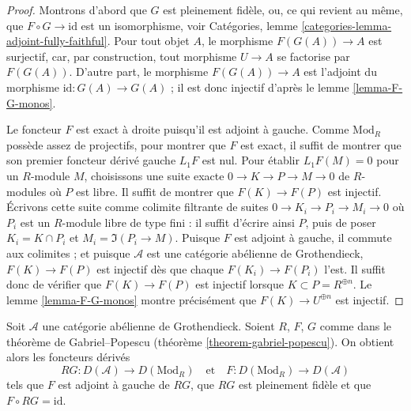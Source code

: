 \begin{proof}
Montrons d'abord que $G$ est pleinement fidèle, ou, ce qui revient au même,
que $F \circ G \to \text{id}$ est un isomorphisme, voir Catégories, lemme
\ref{categories-lemma-adjoint-fully-faithful}. Pour tout objet $A$, le
morphisme $F(G(A)) \to A$ est surjectif, car, par construction, tout morphisme
$U \to A$ se factorise par $F(G(A))$. D'autre part, le morphisme
$F(G(A)) \to A$ est l'adjoint du morphisme
$\text{id} : G(A) \to G(A)$ ; il est donc injectif d'après le lemme
\ref{lemma-F-G-monos}.

\medskip\noindent
Le foncteur $F$ est exact à droite puisqu'il est adjoint à gauche.
Comme $\text{Mod}_R$ possède assez de projectifs, pour montrer que $F$ est
exact, il suffit de montrer que son premier foncteur dérivé gauche $L_1F$ est
nul. Pour établir $L_1F(M) = 0$ pour un $R$-module $M$, choisissons une suite
exacte $0 \to K \to P \to M \to 0$ de $R$-modules où $P$ est libre. Il suffit
de montrer que $F(K) \to F(P)$ est injectif. Écrivons cette suite comme
colimite filtrante de suites $0 \to K_i \to P_i \to M_i \to 0$ où $P_i$ est
un $R$-module libre de type fini : il suffit d'écrire ainsi $P$, puis de poser
$K_i = K \cap P_i$ et $M_i = \Im(P_i \to M)$. Puisque $F$ est adjoint à
gauche, il commute aux colimites ; et puisque $\mathcal{A}$ est une catégorie
abélienne de Grothendieck, $F(K) \to F(P)$ est injectif dès que chaque
$F(K_i) \to F(P_i)$ l'est. Il suffit donc de vérifier que
$F(K) \to F(P)$ est injectif lorsque $K \subset P = R^{\oplus n}$.
Le lemme \ref{lemma-F-G-monos} montre précisément que
$F(K) \to U^{\oplus n}$ est injectif.
\end{proof}

\begin{lemma}
\label{lemma-gabriel-popescu}
\begin{reference}
\cite[Corollary 4.1]{serpe}
\end{reference}
Soit $\mathcal{A}$ une catégorie abélienne de Grothendieck. Soient
$R$, $F$, $G$ comme dans le théorème de Gabriel--Popescu
(théorème \ref{theorem-gabriel-popescu}). On obtient alors les foncteurs
dérivés
$$
RG : D(\mathcal{A}) \to D(\text{Mod}_R)
\quad\text{et}\quad
F : D(\text{Mod}_R) \to D(\mathcal{A})
$$
tels que $F$ est adjoint à gauche de $RG$, que $RG$ est pleinement fidèle et
que $F \circ RG = \text{id}$.
\end{lemma}

